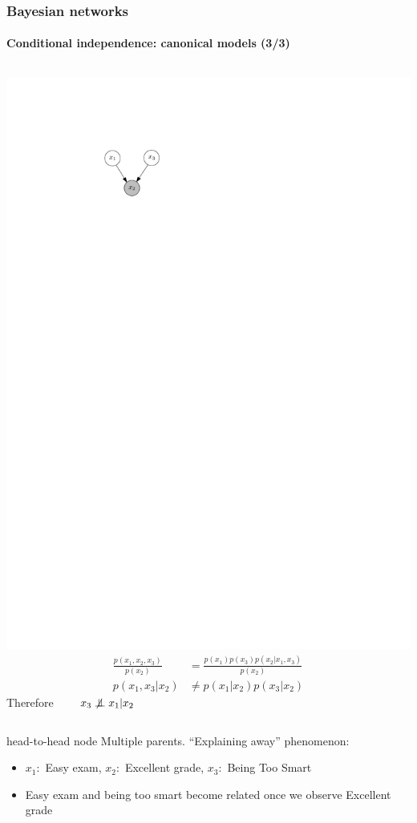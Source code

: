 \documentclass[slidestop,compress,mathserif]{beamer}
\newcommand{\bi}{\begin{itemize}}
\newcommand{\ei}{\end{itemize}}
\newcommand{\notindep}{\ensuremath{\perp\mkern -10mu \perp \mkern -17mu \not \mkern 17mu}} %
\begin{document}
\begin{frame}
	\frametitle{Bayesian networks}
	\framesubtitle{Conditional independence: canonical models (3/3)}
  \begin{columns}
    \includegraphics[width=.8\textwidth]{tailtotail2}%
   \begin{align*}
   \frac{p(x_1,x_2,x_3)}{p(x_2)} & = \frac{p(x_1)p(x_3)p(x_2|x_1,x_3)}{p(x_2)} \\
    p(x_1,x_3|x_2) & \neq p(x_1|x_2)p(x_3|x_2) %
   \end{align*}
  Therefore $\qquad x_3\notindep x_1 | x_2$
   \end{columns} 
    \begin{block}{head-to-head node}
    Multiple parents. ``Explaining away'' phenomenon:
    \bi
    \item
     $x_1: $ Easy exam, $x_2 :$ Excellent grade, $x_3 :$ Being Too Smart
    \item Easy exam and being too smart become related once we observe Excellent grade
        \ei
    \end{block}
\end{frame}
\end{document}
